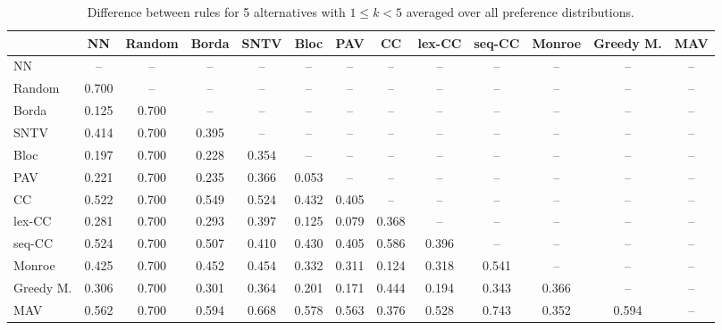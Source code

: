 
\begin{table*}[h!]
\centering
\begin{tabular}{lcccccccccccc}
\toprule
 & NN & Random & Borda & SNTV & Bloc & PAV & CC & lex-CC & seq-CC & Monroe & Greedy M. & MAV \\
\midrule
NN & -- & -- & -- & -- & -- & -- & -- & -- & -- & -- & -- & -- \\
Random & 0.700 & -- & -- & -- & -- & -- & -- & -- & -- & -- & -- & -- \\
Borda & 0.125 & 0.700 & -- & -- & -- & -- & -- & -- & -- & -- & -- & -- \\
SNTV & 0.414 & 0.700 & 0.395 & -- & -- & -- & -- & -- & -- & -- & -- & -- \\
Bloc & 0.197 & 0.700 & 0.228 & 0.354 & -- & -- & -- & -- & -- & -- & -- & -- \\
PAV & 0.221 & 0.700 & 0.235 & 0.366 & 0.053 & -- & -- & -- & -- & -- & -- & -- \\
CC & 0.522 & 0.700 & 0.549 & 0.524 & 0.432 & 0.405 & -- & -- & -- & -- & -- & -- \\
lex-CC & 0.281 & 0.700 & 0.293 & 0.397 & 0.125 & 0.079 & 0.368 & -- & -- & -- & -- & -- \\
seq-CC & 0.524 & 0.700 & 0.507 & 0.410 & 0.430 & 0.405 & 0.586 & 0.396 & -- & -- & -- & -- \\
Monroe & 0.425 & 0.700 & 0.452 & 0.454 & 0.332 & 0.311 & 0.124 & 0.318 & 0.541 & -- & -- & -- \\
Greedy M. & 0.306 & 0.700 & 0.301 & 0.364 & 0.201 & 0.171 & 0.444 & 0.194 & 0.343 & 0.366 & -- & -- \\
MAV & 0.562 & 0.700 & 0.594 & 0.668 & 0.578 & 0.563 & 0.376 & 0.528 & 0.743 & 0.352 & 0.594 & -- \\
\bottomrule
\end{tabular}

\caption{Difference between rules for 5 alternatives with $1 \leq k < 5$ averaged over all preference distributions.}
\end{table*}
